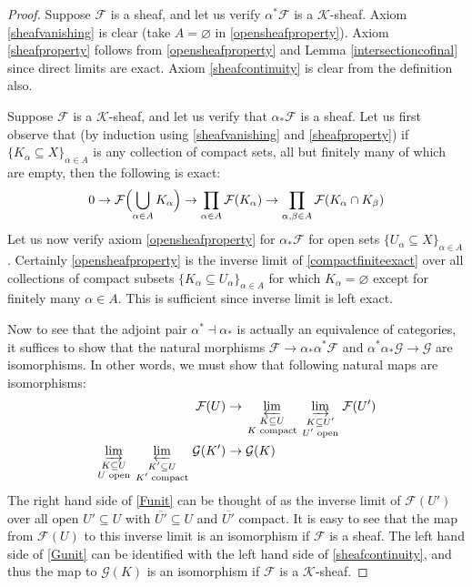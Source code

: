 \documentclass[12pt]{article}
\theoremstyle{definition}
\theoremstyle{remark}
\numberwithin{equation}{subsection}
\newcommand{\F}{\mathcal F}
\newcommand{\G}{\mathcal G}
\newcommand{\K}{\mathcal K}
\begin{document}
\begin{proof}
Suppose $\F$ is a sheaf, and let us verify $\alpha^\ast\F$ is a $\K$-sheaf.  Axiom \eqref{sheafvanishing} is clear (take $A=\varnothing$ in \eqref{opensheafproperty}).  Axiom \eqref{sheafproperty} follows from \eqref{opensheafproperty} and Lemma \ref{intersectioncofinal} since direct limits are exact.  Axiom \eqref{sheafcontinuity} is clear from the definition also.

Suppose $\F$ is a $\K$-sheaf, and let us verify that $\alpha_\ast\F$ is a sheaf.  Let us first observe that (by induction using \eqref{sheafvanishing} and \eqref{sheafproperty}) if $\{K_\alpha\subseteq X\}_{\alpha\in A}$ is any collection of compact sets, all but finitely many of which are empty, then the following is exact:
\begin{equation}\label{compactfiniteexact}
0\to\F\Bigl(\bigcup_{\alpha\in A}K_\alpha\Bigr)\to\prod_{\alpha\in A}\F(K_\alpha)\to\prod_{\alpha,\beta\in A}\F(K_\alpha\cap K_\beta)
\end{equation}
Let us now verify axiom \eqref{opensheafproperty} for $\alpha_\ast\F$ for open sets $\{U_\alpha\subseteq X\}_{\alpha\in A}$.  Certainly \eqref{opensheafproperty} is the inverse limit of \eqref{compactfiniteexact} over all collections of compact subsets $\{K_\alpha\subseteq U_\alpha\}_{\alpha\in A}$ for which $K_\alpha=\varnothing$ except for finitely many $\alpha\in A$.  This is sufficient since inverse limit is left exact.

Now to see that the adjoint pair $\alpha^\ast\dashv\alpha_\ast$ is actually an equivalence of categories, it suffices to show that the natural morphisms $\F\to\alpha_\ast\alpha^\ast\F$ and $\alpha^\ast\alpha_\ast\G\to\G$ are isomorphisms.  In other words, we must show that following natural maps are isomorphisms:
\begin{align}
\label{Funit}\F(U)&\to\varprojlim_{\begin{smallmatrix}K\subseteq U\cr K\textrm{ compact}\end{smallmatrix}}\varinjlim_{\begin{smallmatrix}K\subseteq U'\cr U'\textrm{ open}\end{smallmatrix}}\F(U')\\
\label{Gunit}\varinjlim_{\begin{smallmatrix}K\subseteq U\cr U\textrm{ open}\end{smallmatrix}}\varprojlim_{\begin{smallmatrix}K'\subseteq U\cr K'\textrm{ compact}\end{smallmatrix}}\G(K')&\to\G(K)
\end{align}
The right hand side of \eqref{Funit} can be thought of as the inverse limit of $\F(U')$ over all open $U'\subseteq U$ with $\overline{U'}\subseteq U$ and $\overline{U'}$ compact.  It is easy to see that the map from $\F(U)$ to this inverse limit is an isomorphism if $\F$ is a sheaf.  The left hand side of \eqref{Gunit} can be identified with the left hand side of \eqref{sheafcontinuity}, and thus the map to $\G(K)$ is an isomorphism if $\F$ is a $\K$-sheaf.
\end{proof}
\end{document}
